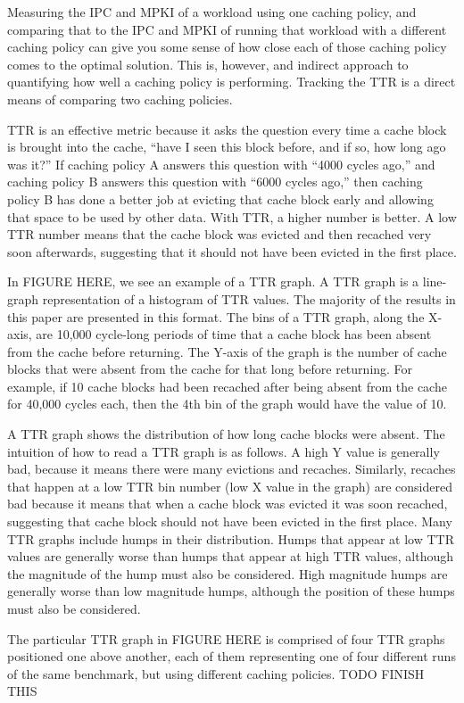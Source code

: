 Measuring the IPC and MPKI of a workload using one caching policy, and
comparing that to the IPC and MPKI of running that workload with a
different caching policy can give you some sense of how close each of
those caching policy comes to the optimal solution.  This is,
however, and indirect approach to quantifying how well a caching
policy is performing.  Tracking the TTR is a direct means of
comparing two caching policies.

TTR is an effective metric because it asks the question every time a
cache block is brought into the cache, ``have I seen this block
before, and if so, how long ago was it?''  If caching policy A answers
this question with ``4000 cycles ago,'' and caching policy B answers
this question with ``6000 cycles ago,'' then caching policy B has done
a better job at evicting that cache block early and allowing that
space to be used by other data.  With TTR, a higher number is better.
A low TTR number means that the cache block was evicted and then
recached very soon afterwards, suggesting that it should not have
been evicted in the first place.

In FIGURE HERE, we see an example of a TTR graph.  A TTR graph is a
line-graph representation of a histogram of TTR values.  The majority
of
the results in this paper are presented in this format.  The bins of a
TTR graph, along the X-axis,  are 10,000 cycle-long periods of time
that a cache block has
been absent from the cache before returning.  The Y-axis of the graph
is the number of cache blocks that were absent from the cache for that
long before returning.  For example, if 10 cache blocks had been
recached after being absent from the cache for 40,000 cycles each,
then the 4th bin of the graph would have the value of 10.

A TTR graph shows the distribution of how long cache blocks were
absent.  The intuition of how to read a TTR graph is as follows.  A
high Y value is generally bad, because it means there were many
evictions
and recaches.  Similarly, recaches that happen at a low TTR bin number
(low X value in the graph) are considered bad because it means that
when a cache block was evicted it was soon recached, suggesting that
cache block should not have been evicted in the first place.  Many TTR
graphs include humps in their distribution.  Humps that appear at low
TTR values are generally worse than humps that appear at high TTR
values, although the magnitude of the hump must also be considered.
High magnitude humps are generally worse than low magnitude humps,
although the position of these humps must also be considered.

The particular TTR graph in FIGURE HERE is comprised of four TTR
graphs positioned one above another, each of them representing one of
four different runs of the same benchmark, but using different caching
policies.  TODO FINISH THIS
